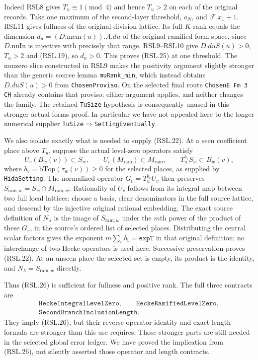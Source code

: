 Indeed RSL8 gives $T_u\equiv1\pmod4$ and hence $T_u>2$
on each of the original records.  Take one maximum of
the second-layer threshold, $a_N$, and
$\mathcal F.x_1+1$.  RSL11 gives fullness of the original
division lattice.  Its full $K$-rank equals the dimension
$d_u=(D.\mathrm{mem}(u)).A.du$ of the original ramified form space, since
$D.\mathrm{nuIn}$ is injective with precisely that range.
RSL9--RSL10 give $D.duS(u)>0$, $T_u>2$ and (RSL.19),
so $d_u>0$.  This proves (RSL.25) at one threshold.
The nonzero slice constructed in RSL9 makes the positivity
argument slightly stronger than the generic source lemma
\texttt{muRank\_min}, which instead obtains $D.duS(u)>0$
from \texttt{ChosenProviso}.  On the selected final route
\texttt{ChosenE Fm 3 CH} already contains that proviso;
either argument applies, and neither changes the family.
The retained \texttt{TuSize} hypothesis is consequently
unused in this stronger actual-forms proof.  In particular
we have not appealed here to the longer numerical supplier
\texttt{TuSize}$\Rightarrow$\texttt{SettingEventually}.

We also isolate exactly what is needed to supply (RSL.22).
At a seen coefficient place above $T_u$, suppose the actual
level-zero operators satisfy
\[
 U_v(B_w(v))\subset S_w,\qquad
 U_v(M_{\mathrm{ram}})\subset M_{\mathrm{ram}},\qquad
 T_u^{b_v}S_w\subset B_w(v),
                                                                  \tag{RSL.26}
\]
where $b_v=\mathrm{bTop}(\tau_w(v))\ge0$ for the selected
places, as supplied by \texttt{HidaSetting}.  The normalized
operator $G_v=T_u^{b_v}U_v$ then preserves
$S_{\mathrm{ram},w}=S_w\cap M_{\mathrm{ram},w}$.
Rationality of $U_v$ follows from its integral map between
two full local lattices: choose a basis, clear denominators
in the full source lattice, and descend by the injective
original rational embedding.  The exact source definition
of $N_\lambda$ is the image of $S_{\mathrm{ram},w}$ under
the $m$th power of the product of these $G_v$, in the
source's ordered list of selected places.  Distributing the
central scalar factors gives the exponent
$m\sum_v b_v=\texttt{expT}$ in that original definition;
no interchange of two Hecke operators is used here.
Successive preservation proves (RSL.22).  At an unseen
place the selected set is empty, its product is the
identity, and $N_\lambda=S_{\mathrm{ram},w}$ directly.

Thus (RSL.26) is sufficient for fullness and positive rank.
The full three contracts are
\[
 \begin{gathered}
 \texttt{HeckeIntegralLevelZero},\qquad
 \texttt{HeckeRamifiedLevelZero},\\
 \texttt{SecondBranchInclusionLength}.
 \end{gathered}
\]
They imply (RSL.26), but
their reverse-operator identity and exact length formula
are stronger than this use requires.  Those stronger
parts are still needed in the selected global error
ledger.  We have proved the implication from (RSL.26),
not silently asserted those operator and length contracts.

